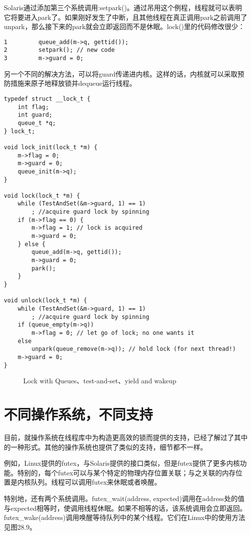 Solaris通过添加第三个系统调用:setpark()。通过吊用这个例程，线程就可以表明它将要进入park了。如果刚好发生了中断，且其他线程在真正调用park之前调用了unpark，那么接下来的park就会立即返回而不是休眠。lock()里的代码修改很少：

\begin{verbatim}
1         queue_add(m->q, gettid());
2         setpark(); // new code
3         m->guard = 0;
\end{verbatim}

另一个不同的解决方法，可以将guard传递进内核。这样的话，内核就可以采取预防措施来原子地释放锁并dequeue运行线程。

\begin{lstlisting}
typedef struct __lock_t {
    int flag;
    int guard;
    queue_t *q;
} lock_t;

void lock_init(lock_t *m) {
    m->flag = 0;
    m->guard = 0;
    queue_init(m->q);
}

void lock(lock_t *m) {
    while (TestAndSet(&m->guard, 1) == 1)
        ; //acquire guard lock by spinning
    if (m->flag == 0) {
        m->flag = 1; // lock is acquired
        m->guard = 0;
    } else {
        queue_add(m->q, gettid());
        m->guard = 0;
        park();
    }
}

void unlock(lock_t *m) {
    while (TestAndSet(&m->guard, 1) == 1)
        ; //acquire guard lock by spinning
    if (queue_empty(m->q))
        m->flag = 0; // let go of lock; no one wants it
    else
        unpark(queue_remove(m->q)); // hold lock (for next thread!)
    m->guard = 0;
}
\end{lstlisting}
\begin{figure}[h]
\setlength{\abovecaptionskip}{1pt}
\caption{Lock with Queues、test-and-set、yield and wakeup}
\setlength{\belowcaptionskip}{1pt}
\end{figure}

\section{不同操作系统，不同支持}

目前，就操作系统在线程库中为构造更高效的锁而提供的支持，已经了解过了其中的一种形式。其他的操作系统也提供了类似的支持，细节都不一样。

例如，Linux提供的futex，与Solaris提供的接口类似，但是futex提供了更多内核功能。特别的，每个futex可以与某个特定的物理内存位置关联；与之关联的内存位置是内核队列。线程可以调用futex来休眠或者唤醒。

特别地，还有两个系统调用。futex\_wait(address, expected)调用在address处的值与expected相等时，使调用线程休眠。如果不相等的话，该系统调用会立即返回。futex\_wake(address)调用唤醒等待队列中的某个线程。它们在Linux中的使用方法见图28.9。

